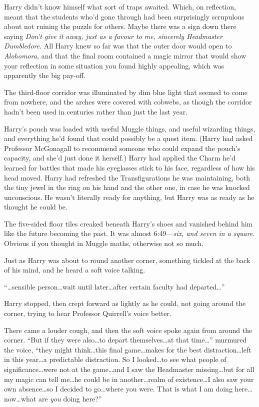 Harry didn’t know himself what sort of traps awaited. Which, on reflection, meant that the students who’d gone through had been surprisingly scrupulous about not ruining the puzzle for others. Maybe there was a sign down there saying \emph{Don’t give it away, just as a favour to me, sincerely Headmaster Dumbledore}. All Harry knew so far was that the outer door would open to \emph{Alohomora,} and that the final room contained a magic mirror that would show your reflection in some situation you found highly appealing, which was apparently the big pay-off.

The third-floor corridor was illuminated by dim blue light that seemed to come from nowhere, and the arches were covered with cobwebs, as though the corridor hadn’t been used in centuries rather than just the last year.

Harry’s pouch was loaded with useful Muggle things, and useful wizarding things, and everything he’d found that could possibly be a quest item. (Harry had asked Professor McGonagall to recommend someone who could expand the pouch’s capacity, and she’d just done it herself.) Harry had applied the Charm he’d learned for battles that made his eyeglasses stick to his face, regardless of how his head moved. Harry had refreshed the Transfigurations he was maintaining, both the tiny jewel in the ring on his hand and the other one, in case he was knocked unconscious. He wasn’t literally ready for anything, but Harry was as ready as he thought he could be.

The five-sided floor tiles creaked beneath Harry’s shoes and vanished behind him like the future becoming the past. It was almost 6:49—\emph{six, and seven in a square}. Obvious if you thought in Muggle maths, otherwise not so much.

Just as Harry was about to round another corner, something tickled at the back of his mind, and he heard a soft voice talking.

“…sensible person…wait until later…after certain faculty had departed…”

Harry stopped, then crept forward as lightly as he could, not going around the corner, trying to hear Professor Quirrell’s voice better.

There came a louder cough, and then the soft voice spoke again from around the corner. “But if they were also…to depart themselves…at that time…” murmured the voice, “they might think…this final game…makes for the best distraction…left in this year…a predictable distraction. So I looked…to see what people of significance…were not at the game…and I saw the Headmaster missing…but for all my magic can tell me…he could be in another…realm of existence…I also saw your own absence…so I decided to go…where you were. That is what I am doing here…now…what are \emph{you} doing here?”

